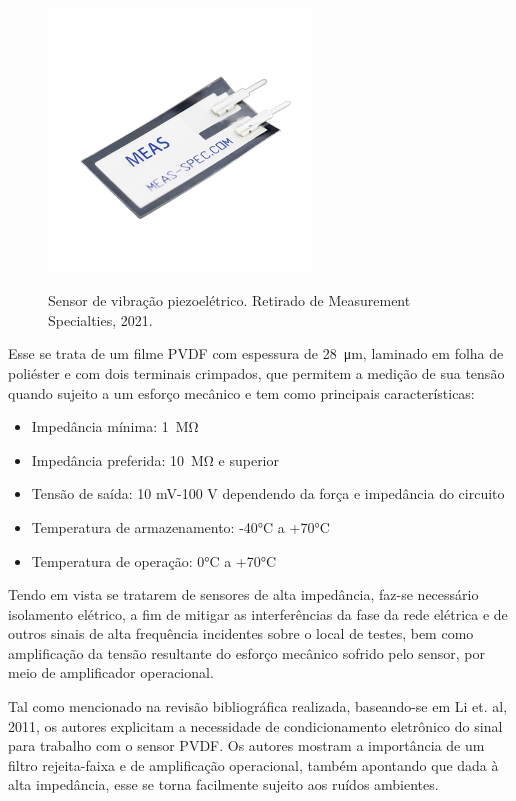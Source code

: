\documentclass[
	12pt,				
	oneside,			
	a4paper,			
	english,			
	brazil,			
	]{abntex2ppgsi}
\begin{document}
\begin{figure}[H]
\centering
\caption {Sensor de vibração piezoelétrico. Retirado de Measurement Specialties, 2021.}
\includegraphics[width=\textwidth,height=70mm,keepaspectratio]{Figura21} 
\label{Figura21}
\end{figure} 

Esse se trata de um filme PVDF com espessura de \SI{28}{\micro\meter}, laminado em folha de poliéster e com dois terminais crimpados, que permitem a medição de sua tensão quando sujeito a um esforço mecânico e tem como principais características: 

\begin{itemize}
	\item Impedância mínima: \SI{1}{\mega\ohm}
	\item Impedância preferida: \SI{10}{\mega\ohm} e superior
	\item Tensão de saída: 10 mV-100 V dependendo da força e impedância do circuito
	\item Temperatura de armazenamento: -40°C a +70°C 
	\item Temperatura de operação: 0°C a +70°C
\end{itemize}

Tendo em vista se tratarem de sensores de alta impedância, faz-se necessário isolamento elétrico, a fim de mitigar as interferências da fase da rede elétrica e de outros sinais de alta frequência incidentes sobre o local de testes, bem como amplificação da tensão resultante do esforço mecânico sofrido pelo sensor, por meio de amplificador operacional. 

Tal como mencionado na revisão bibliográfica realizada, baseando-se em Li et. al, 2011, os autores explicitam a necessidade de condicionamento eletrônico do sinal para trabalho com o sensor PVDF. Os autores mostram a importância de um filtro rejeita-faixa e de amplificação operacional, também apontando que dada à alta impedância, esse se torna facilmente sujeito aos ruídos ambientes. 
\end{document}
